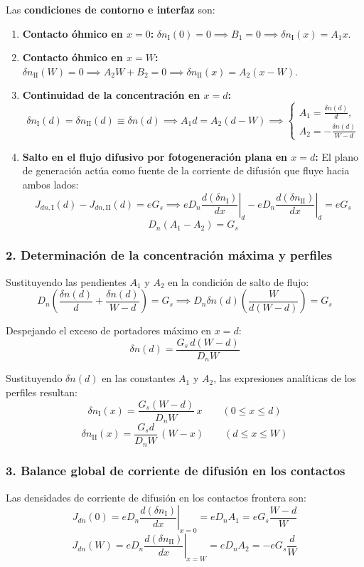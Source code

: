 \begin{problema}
Las \textbf{condiciones de contorno e interfaz} son:
\begin{enumerate}[label=\arabic*.]
    \item \textbf{Contacto óhmico en $x = 0$:} $\delta n_{\text{I}}(0) = 0 \implies B_1 = 0 \implies \delta n_{\text{I}}(x) = A_1 x$.
    \item \textbf{Contacto óhmico en $x = W$:} $\delta n_{\text{II}}(W) = 0 \implies A_2 W + B_2 = 0 \implies \delta n_{\text{II}}(x) = A_2 (x - W)$.
    \item \textbf{Continuidad de la concentración en $x = d$:}
    \[
    \delta n_{\text{I}}(d) = \delta n_{\text{II}}(d) \equiv \delta n(d) \implies A_1 d = A_2 (d - W) \implies 
    \begin{cases}
        A_1 = \frac{\delta n(d)}{d}, \\ 
        A_2 = -\frac{\delta n(d)}{W - d}
    \end{cases}
    \]
    \item \textbf{Salto en el flujo difusivo por fotogeneración plana en $x = d$:}
    El plano de generación actúa como fuente de la corriente de difusión que fluye hacia ambos lados:
    \[
    J_{dn,\text{I}}(d) - J_{dn,\text{II}}(d) = e G_s \implies e D_n \left. \frac{d(\delta n_{\text{I}})}{dx} \right|_{d} - e D_n \left. \frac{d(\delta n_{\text{II}})}{dx} \right|_{d} = e G_s
    \]
    \[
    D_n (A_1 - A_2) = G_s
    \]
\end{enumerate}

\subsubsection*{2. Determinación de la concentración máxima y perfiles}
Sustituyendo las pendientes $A_1$ y $A_2$ en la condición de salto de flujo:
\[
D_n \left( \frac{\delta n(d)}{d} + \frac{\delta n(d)}{W - d} \right) = G_s \implies D_n \delta n(d) \left( \frac{W}{d(W - d)} \right) = G_s
\]

Despejando el exceso de portadores máximo en $x = d$:
\[
\delta n(d) = \frac{G_s \, d (W - d)}{D_n W}
\]

Sustituyendo $\delta n(d)$ en las constantes $A_1$ y $A_2$, las expresiones analíticas de los perfiles resultan:
\[
\delta n_{\text{I}}(x) = \frac{G_s (W - d)}{D_n W} \, x \qquad (0 \le x \le d)
\]
\[
\delta n_{\text{II}}(x) = \frac{G_s d}{D_n W} \, (W - x) \qquad (d \le x \le W)
\]

\subsubsection*{3. Balance global de corriente de difusión en los contactos}
Las densidades de corriente de difusión en los contactos frontera son:
\[
J_{dn}(0) = e D_n \left. \frac{d(\delta n_{\text{I}})}{dx} \right|_{x=0} = e D_n A_1 = e G_s \frac{W - d}{W}
\]
\[
J_{dn}(W) = e D_n \left. \frac{d(\delta n_{\text{II}})}{dx} \right|_{x=W} = e D_n A_2 = -e G_s \frac{d}{W}
\]


\end{problema}
